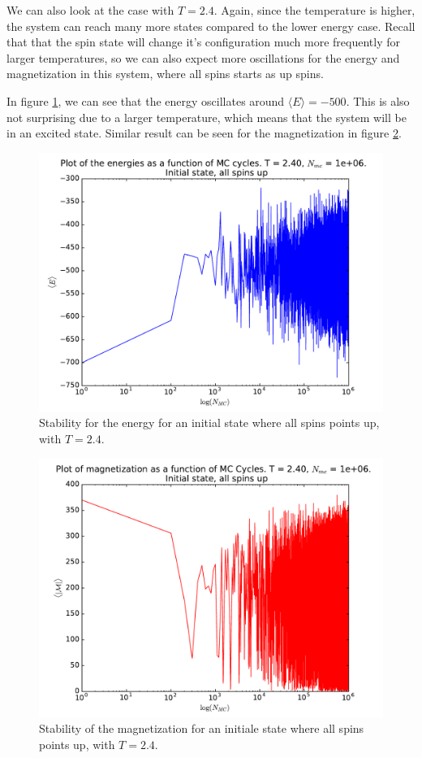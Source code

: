 \documentclass[12pt]{article}
\begin{document}
We can also look at the case with $T=2.4$. Again, since the temperature is higher, the system can reach many more states  compared to the lower energy case. Recall that that the spin state will change it's configuration much more frequently for larger temperatures, so we can also expect more oscillations for the energy and magnetization in this system, where all spins starts as up spins.

In figure \ref{fig:Energy_stab_log_T2_SpinUp}, we can see that the energy oscillates around $\langle E \rangle = -500$. This is also not surprising due to a larger temperature, which means that the system will be in an excited state. Similar result can be seen for the magnetization in figure \ref{fig:Mag_stab_log_T2_SpinUp}.
\begin{figure}[H]
\centering
\includegraphics[width=\linewidth]{Plots/Energy_stability_UpInitSpin_logarithmic_T24.pdf}
\caption{Stability for the energy for an initial state where all spins points up, with $T=2.4$. }
\label{fig:Energy_stab_log_T2_SpinUp}
\end{figure}
\begin{figure}[H]
\centering
\includegraphics[width=\linewidth]{Plots/Magnetization_stability_UpInitSpin_logarithmic_T24.pdf}
\caption{Stability of the magnetization for an initiale state where all spins points up, with $T=2.4$.}
\label{fig:Mag_stab_log_T2_SpinUp}
\end{figure}
\end{document}
